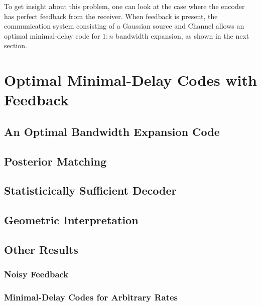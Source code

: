 To get insight about this problem, one can look at the case where the encoder
has perfect feedback from the receiver. When feedback is present, the
communication system consisting of a Gaussian source and Channel allows an
optimal minimal-delay code for $1:n$ bandwidth expansion, as shown in the next
section.


\section{Optimal Minimal-Delay Codes with Feedback}
\label{sec:optmindelfb}

\subsection{An Optimal Bandwidth Expansion Code}


\subsection{Posterior Matching}


\subsection{Statisticically Sufficient Decoder}


\subsection{Geometric Interpretation}


\subsection{Other Results}

\subsubsection{Noisy Feedback}

\subsubsection{Minimal-Delay Codes for Arbitrary Rates}


